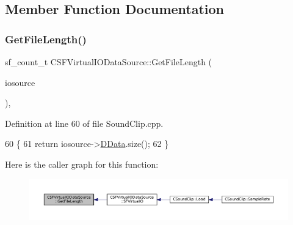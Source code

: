 \subsection{Member Function Documentation}
\hypertarget{classCSFVirtualIODataSource_a94ee0d9f4703661ca7f2cad8cf294690}{}\label{classCSFVirtualIODataSource_a94ee0d9f4703661ca7f2cad8cf294690} 
\subsubsection{\texorpdfstring{Get\+File\+Length()}{GetFileLength()}}
{\footnotesize\ttfamily sf\+\_\+count\+\_\+t C\+S\+F\+Virtual\+I\+O\+Data\+Source\+::\+Get\+File\+Length (\begin{DoxyParamCaption}\item[{\hyperlink{classCSFVirtualIODataSource}{C\+S\+F\+Virtual\+I\+O\+Data\+Source} $\ast$}]{iosource }\end{DoxyParamCaption})\hspace{0.3cm}{\ttfamily [static]}, {\ttfamily [protected]}}



Definition at line 60 of file Sound\+Clip.\+cpp.


\begin{DoxyCode}
60                                                                                 \{
61     \textcolor{keywordflow}{return} iosource->\hyperlink{classCSFVirtualIODataSource_ac03be5c46b6647150e12edc04fa52ede}{DData}.size();
62 \}
\end{DoxyCode}
Here is the caller graph for this function\+:\nopagebreak
\begin{figure}[H]
\begin{center}
\leavevmode
\includegraphics[width=350pt]{classCSFVirtualIODataSource_a94ee0d9f4703661ca7f2cad8cf294690_icgraph}
\end{center}
\end{figure}
\hypertarget{classCSFVirtualIODataSource_a40021962590f0911d8af1020397fbba1}{}\label{classCSFVirtualIODataSource_a40021962590f0911d8af1020397fbba1} 

